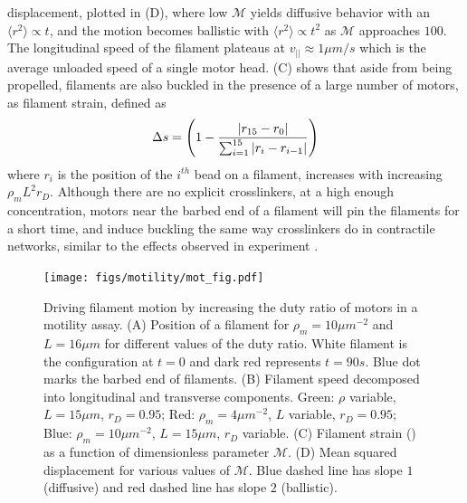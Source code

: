 \documentclass[12pt]{article}
\begin{document}
displacement, plotted in (D), where low $\mathcal{M}$ 
yields diffusive behavior with an $\langle r^2 \rangle \propto t$, and the
motion becomes ballistic with $\langle r^2\rangle\propto t^2$ as $\mathcal{M}$ 
approaches $100$. The longitudinal speed of the filament plateaus at
$v_{||}\approx 1\mu m/s$ which is the average unloaded speed of a single motor 
head\cite{kron1986}. (C) shows that aside from being
propelled, filaments are also buckled in the presence of a large number of
motors, as filament strain, defined as
\begin{equation} 
  \Delta s = \left(1 - {|r_{15}-r_0|\over\sum_{i=1}^{15}{|r_i-r_{i-1}|}}\right) 
  \label{eqn:fil_strain}
\end{equation} 
where $r_i$ is the position of the $i^{th}$ bead on a filament, increases with 
increasing $\rho_m L^2 r_D$.
Although there are no explicit crosslinkers, at a high enough concentration, 
motors near the barbed end of a filament will pin the filaments for a short 
time, and induce buckling the same way crosslinkers do in contractile networks, 
similar to the effects observed in experiment \cite{schaller2010}.
\begin{figure}[H] 
    \centering
    \texttt{[image: figs/motility/mot\_fig.pdf]}
  \caption{%
  \label{fig:motility}%
  Driving filament motion by increasing the duty ratio of motors in a motility assay. 
  (A) Position of a filament for $\rho_m = 10\mu m^{-2}$ and $L = 16\mu m$ for
  different values of the duty ratio. White filament is the configuration at
  $t=0$ and dark red represents $t=90s$. Blue dot marks the barbed end of
  filaments.  
  (B) Filament speed decomposed into longitudinal and transverse components. 
  Green: $\rho$ variable, $L=15\mu m$, $r_D=0.95$; Red:
  $\rho_m=4\mu m^{-2}$, $L$ variable, $r_D=0.95$; Blue: $\rho_m = 10\mu m^{-2}$,
  $L=15\mu m$, $r_D$ variable.  
  (C) Filament strain () as a function of
  dimensionless parameter $\mathcal{M}$.
  (D) Mean squared displacement for various values of $\mathcal{M}$. Blue dashed 
  line has slope $1$ (diffusive) and red dashed line has slope $2$ (ballistic).
 }
\end{figure}
\end{document}
